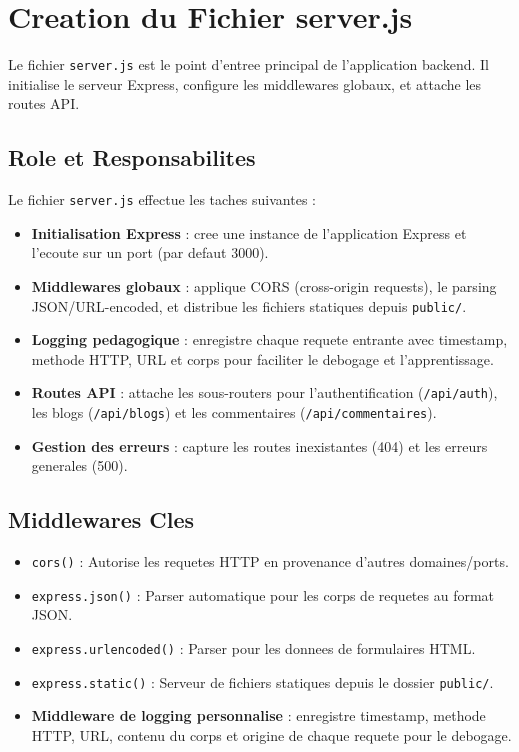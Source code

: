 \documentclass[a4paper,12pt]{book}
\begin{document}
\section{Creation du Fichier server.js}

Le fichier \texttt{server.js} est le point d'entree principal de l'application backend. Il initialise le serveur Express, configure les middlewares globaux, et attache les routes API.

\subsection{Role et Responsabilites}

Le fichier \texttt{server.js} effectue les taches suivantes :

\begin{itemize}
    \item \textbf{Initialisation Express} : cree une instance de l'application Express et l'ecoute sur un port (par defaut 3000).
    \item \textbf{Middlewares globaux} : applique CORS (cross-origin requests), le parsing JSON/URL-encoded, et distribue les fichiers statiques depuis \texttt{public/}.
    \item \textbf{Logging pedagogique} : enregistre chaque requete entrante avec timestamp, methode HTTP, URL et corps pour faciliter le debogage et l'apprentissage.
    \item \textbf{Routes API} : attache les sous-routers pour l'authentification (\texttt{/api/auth}), les blogs (\texttt{/api/blogs}) et les commentaires (\texttt{/api/commentaires}).
    \item \textbf{Gestion des erreurs} : capture les routes inexistantes (404) et les erreurs generales (500).
\end{itemize}

\subsection{Middlewares Cles}

\begin{itemize}
    \item \texttt{cors()} : Autorise les requetes HTTP en provenance d'autres domaines/ports.
    \item \texttt{express.json()} : Parser automatique pour les corps de requetes au format JSON.
    \item \texttt{express.urlencoded()} : Parser pour les donnees de formulaires HTML.
    \item \texttt{express.static()} : Serveur de fichiers statiques depuis le dossier \texttt{public/}.
    \item \textbf{Middleware de logging personnalise} : enregistre timestamp, methode HTTP, URL, contenu du corps et origine de chaque requete pour le debogage.
\end{itemize}
\end{document}
